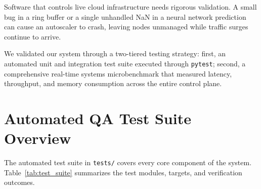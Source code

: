 \documentclass[12pt]{report}
\begin{document}
Software that controls live cloud infrastructure needs rigorous validation. A small bug in a ring buffer or a single unhandled NaN in a neural network prediction can cause an autoscaler to crash, leaving nodes unmanaged while traffic surges continue to arrive. 

We validated our system through a two-tiered testing strategy: first, an automated unit and integration test suite executed through \texttt{pytest}; second, a comprehensive real-time systems microbenchmark that measured latency, throughput, and memory consumption across the entire control plane.

\section{Automated QA Test Suite Overview}

The automated test suite in \texttt{tests/\allowbreak } covers every core component of the system. Table~\ref{tab:test_suite} summarizes the test modules, targets, and verification outcomes.

\begin{table}[htbp]
\centering
\caption{Automated Unit and Integration Test Suite Verification}
\label{tab:test_suite}
\end{table}
\end{document}
